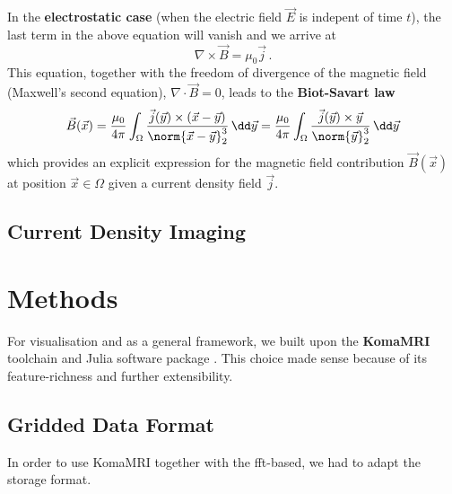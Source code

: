\documentclass[12pt]{article}
\begin{document}
  In the \textbf{electrostatic case} (when the electric field $\vec{E}$ is indepent of time $t$), the last term in the above equation will vanish and we arrive at
  $$\nabla \times \vec{B} = \mu_0 \vec{j}\,.$$
  This equation, together with the freedom of divergence of the magnetic field (Maxwell's second equation), $\nabla \cdot \vec{B} = 0$, leads to the \textbf{Biot-Savart law}
  \begin{equation}
    \vec{B}(\vec{x})
    = \frac{\mu_0}{4\pi} \int_\Omega \frac{\vec{j}(\vec{y}) \times (\vec{x} - \vec{y})}{\norm{\vec{x} - \vec{y}}_2^3} \,\dd\vec{y}
    = \frac{\mu_0}{4\pi} \int_\Omega \frac{\vec{j}(\vec{y}) \times \vec{y}}{\norm{\vec{y}}_2^3} \,\dd\vec{y}
    \label{eq:biot-savart}
  \end{equation}
  which provides an explicit expression for the magnetic field contribution $\vec{B}(\vec{x})$ at position $\vec{x} \in \Omega$ given a current density field $\vec{j}$.

  \subsection{Current Density Imaging}

  \section{Methods}
  For visualisation and as a general framework, we built upon the \textbf{KomaMRI} toolchain and Julia software package \parencite{2022-koma-mri}.
  This choice made sense because of its feature-richness and further extensibility.

  \subsection{Gridded Data Format}
  In order to use KomaMRI together with the \gls{fft}-based, we had to adapt the storage format.
\end{document}
